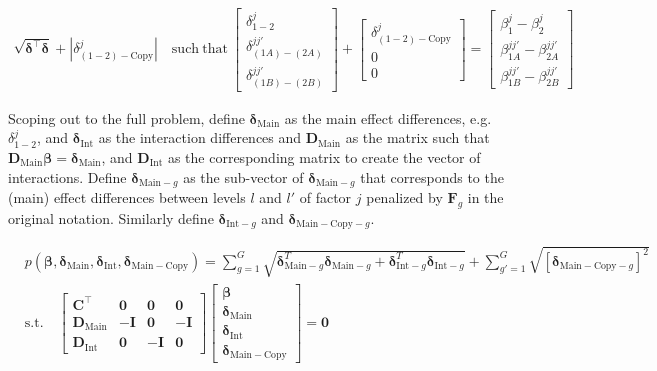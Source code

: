 \begin{equation}
\begin{split}
\sqrt{\bm{\delta}^\top\bm{\delta}} + |\delta^j_{(1-2)-\mathrm{Copy}}| \quad \mathrm{such~that}~\left[\begin{array}{l} \delta^j_{1-2} \\ \delta^{jj'}_{(1A)-(2A)} \\ \delta^{jj'}_{(1B)-(2B)} \end{array}\right] + \left[\begin{array}{l} \delta^j_{(1-2)-\mathrm{Copy}} \\ 0 \\ 0 \end{array}\right] = \left[\begin{array}{lll} \beta^j_1 - \beta^j_2 \\ \beta^{jj'}_{1A} - \beta^{jj'}_{2A} \\ \beta^{jj'}_{1B} - \beta^{jj'}_{2B} \end{array}\right]
\end{split}
\end{equation} 

Scoping out to the full problem, define $\bm{\delta}_{\mathrm{Main}}$
as the main effect differences, e.g. $\delta^j_{1-2}$, and
$\bm{\delta}_{\mathrm{Int}}$ as the interaction differences and
$\bm{D}_{\mathrm{Main}}$ as the matrix such that
$\bm{D}_{\mathrm{Main}} \bm{\beta} = \bm{\delta}_{\mathrm{Main}}$, and
$\bm{D}_{\mathrm{Int}}$ as the corresponding matrix to create the
vector of interactions. Define $\bm{\delta}_{\mathrm{Main}-g}$ as the
sub-vector of $\bm{\delta}_{\mathrm{Main}-g}$ that corresponds to the
(main) effect differences between levels $l$ and $l'$ of factor $j$
penalized by $\bm{F}_g$ in the original notation. Similarly define
$\bm{\delta}_{\mathrm{Int}-g}$ and
$\bm{\delta}_{\mathrm{Main-Copy}-g}$.

\begin{equation}
\begin{split} &p(\bm{\beta},\bm{\delta}_{\mathrm{Main}}, \bm{\delta}_{\mathrm{Int}}, \bm{\delta}_{\mathrm{Main-Copy}}) =  \sum_{g=1}^G \sqrt{\bm{\delta}_{\mathrm{Main}-g}^T \bm{\delta}_{\mathrm{Main}-g} +  \bm{\delta}_{\mathrm{Int}-g}^T \bm{\delta}_{\mathrm{Int}-g}} +\sum_{g'=1}^{G} \sqrt{\left[\bm{\delta}_{\mathrm{Main-Copy}-g}\right]^2}\\
  &\mathrm{s.t.} \quad \left[\begin{array}{llll} \bm{C}^\top & \bm{0} & \bm{0} & \bm{0} \\ \bm{D}_{\mathrm{Main}} & -\bm{I} & \bm{0} & -\bm{I} \\ \bm{D}_{\mathrm{Int}} & \bm{0} & -\bm{I} & \bm{0} \end{array}\right] \left[\begin{array}{l} \bm{\beta} \\ \bm{\delta}_{\mathrm{Main}} \\ \bm{\delta}_{\mathrm{Int}} \\ \bm{\delta}_{\mathrm{Main-Copy}} \end{array}\right] = \bm{0} \end{split}
\end{equation} 

